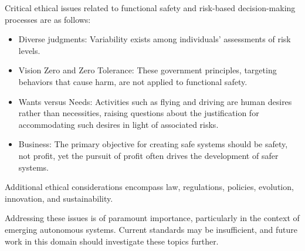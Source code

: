 \documentclass[./dissertation.tex]{subfiles}
\begin{document}
Critical ethical issues related to functional safety and risk-based decision-making processes are as follows:

\begin{itemize}
\item Diverse judgments: Variability exists among individuals' assessments of risk levels.
\item Vision Zero and Zero Tolerance: These government principles, targeting behaviors that cause harm, are not applied to functional safety.
\item Wants versus Needs: Activities such as flying and driving are human desires rather than necessities, raising questions about the justification for accommodating such desires in light of associated risks.
\item Business: The primary objective for creating safe systems should be safety, not profit, yet the pursuit of profit often drives the development of safer systems.

\end{itemize}
Additional ethical considerations encompass law, regulations, policies, evolution, innovation, and sustainability.

Addressing these issues is of paramount importance, particularly in the context of emerging autonomous systems. Current standards may be insufficient, and future work in this domain should investigate these topics further.
\end{document}
